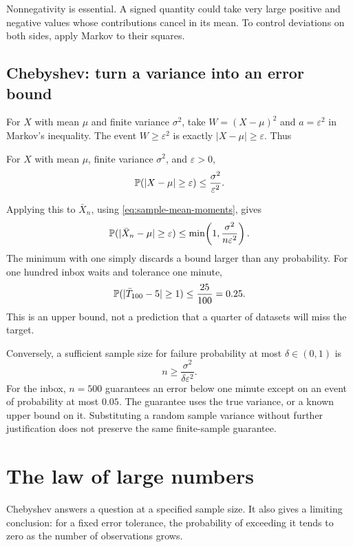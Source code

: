 Nonnegativity is essential. A signed quantity could take very large
positive and negative values whose contributions cancel in its mean.
To control deviations on both sides, apply Markov to their squares.

\subsection{Chebyshev: turn a variance into an error bound}

For \(X\) with mean \(\mu\) and finite variance \(\sigma^2\), take
\(W=(X-\mu)^2\) and \(a=\varepsilon^2\) in Markov's inequality.
The event \(W\ge\varepsilon^2\) is exactly
\(|X-\mu|\ge\varepsilon\). Thus
\begin{theorem}
For \(X\) with mean \(\mu\), finite variance \(\sigma^2\), and
\(\varepsilon>0\),
\begin{equation}
  \mathbb{P}(|X-\mu|\ge\varepsilon)
  \le\frac{\sigma^2}{\varepsilon^2}.
  \label{eq:chebyshev}
\end{equation}
\end{theorem}

Applying this to \(\bar X_n\), using
\eqref{eq:sample-mean-moments}, gives
\begin{equation}
  \mathbb{P}(|\bar X_n-\mu|\ge\varepsilon)
  \le\min\!\left(1,\frac{\sigma^2}{n\varepsilon^2}\right).
  \label{eq:chebyshev-mean}
\end{equation}
The minimum with one simply discards a bound larger than any probability.
For one hundred inbox waits and tolerance one minute,
\[
  \mathbb{P}(|\bar T_{100}-5|\ge1)\le\frac{25}{100}=0.25.
\]
This is an upper bound, not a prediction that a quarter of datasets
will miss the target.

Conversely, a sufficient sample size for failure probability at most
\(\delta\in(0,1)\) is
\[
  n\ge\frac{\sigma^2}{\delta\varepsilon^2}.
\]
For the inbox, \(n=500\) guarantees an error below one minute except
on an event of probability at most \(0.05\). The guarantee uses the
true variance, or a known upper bound on it. Substituting a random
sample variance without further justification does not preserve the
same finite-sample guarantee.

\section{The law of large numbers}
\label{sec:lln}

Chebyshev answers a question at a specified sample size. It also gives
a limiting conclusion: for a fixed error tolerance, the probability
of exceeding it tends to zero as the number of observations grows.

